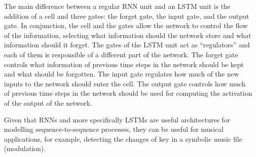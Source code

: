 The main difference between a regular RNN unit and an LSTM unit is the addition of a cell and three gates: the forget gate, the input gate, and the output gate. In conjunction, the cell and the gates allow the network to control the flow of the information, selecting what information should the network store and what information should it forget. 
The gates of the LSTM unit act as ``regulators'' and each of them is responsible of a different part of the network. The forget gate controls what information of previous time steps in the network should be kept and what should be forgotten. The input gate regulates how much of the new inputs to the network should enter the cell. The output gate controls how much of previous time steps in the network should be used for computing the activation of the output of the network.

Given that RNNs and more specifically LSTMs are useful architectures for modelling sequence-to-sequence processes, they can be useful for musical applications, for example, detecting the changes of key in a symbolic music file (modulation).









